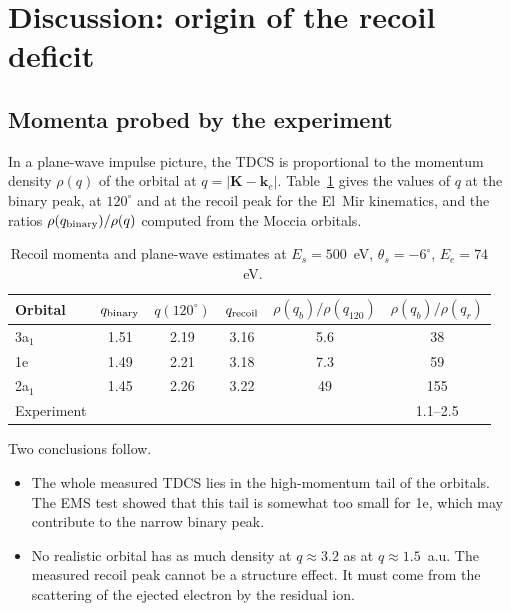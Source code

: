 \documentclass[11pt,a4paper]{article}
\newcommand{\aone}{3a$_1$}
\newcommand{\atwo}{2a$_1$}
\newcommand{\bk}{\mathbf k}
\begin{document}
\section{Discussion: origin of the recoil deficit}\label{sec:discussion}
\subsection{Momenta probed by the experiment}
In a plane-wave impulse picture, the TDCS is proportional to the momentum density
$\rho(q)$ of the orbital at $q=|\mathbf K-\bk_e|$. Table~\ref{tab:q} gives the values of $q$ at the
binary peak, at $120^\circ$ and at the recoil peak for the El~Mir kinematics, and the ratios
$\rho(q_{\rm binary})/\rho(q)$ computed from the Moccia orbitals.

\begin{table}[H]\centering\small
\caption{Recoil momenta and plane-wave estimates at $E_s=500$~eV, $\theta_s=-6^\circ$, $E_e=74$~eV.}\label{tab:q}
\begin{tabular}{lccccc}\toprule
Orbital & $q_{\rm binary}$ & $q(120^\circ)$ & $q_{\rm recoil}$ & $\rho(q_b)/\rho(q_{120})$ & $\rho(q_b)/\rho(q_r)$\\\midrule
\aone & 1.51 & 2.19 & 3.16 & 5.6 & 38\\
1e & 1.49 & 2.21 & 3.18 & 7.3 & 59\\
\atwo & 1.45 & 2.26 & 3.22 & 49 & 155\\
\midrule
Experiment & & & & & 1.1--2.5\\\bottomrule
\end{tabular}
\end{table}

Two conclusions follow.
\begin{itemize}
\item The whole measured TDCS lies in the high-momentum tail of the orbitals. The EMS test showed
  that this tail is somewhat too small for 1e, which may contribute to the narrow binary peak.
\item No realistic orbital has as much density at $q\approx3.2$ as at $q\approx1.5$~a.u. The
  measured recoil peak cannot be a structure effect. It must come from the scattering of the
  ejected electron by the residual ion.
\end{itemize}
\end{document}
